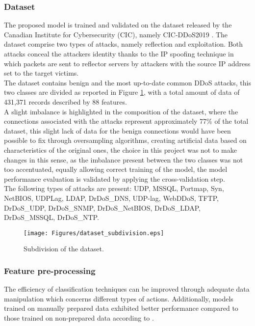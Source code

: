 \documentclass[runningheads]{llncs}
\begin{document}
\subsubsection{Dataset}
The proposed model is trained and validated on the dataset released by the Canadian Institute for Cybersecurity (CIC), namely
CIC-DDoS2019 \cite{dataset}. The dataset comprise two types of attacks, namely reflection and exploitation.
Both attacks conceal the attacker\textquotesingle s identity thanks to the IP spoofing technique \cite{ref_paper4} 
in which packets are sent to reflector servers by attackers with the source IP address set to the target victim\textquotesingle s.\\
The dataset contains benign and the most up-to-date common DDoS attacks, this two classes are divided as reported in
Figure \ref{fig2}, with a total amount of data of 431,371 records described by 88 features.\\
A slight imbalance is highlighted in the composition of the dataset, where the connections associated with the attacks represent approximately 77\% of the total dataset, this slight lack of data for the benign connections would have been possible to fix through oversampling algorithms, creating artificial data based on characteristics of the original ones, the choice in this project was not to make changes in this sense, as the imbalance present between the two classes was not too accentuated, equally allowing correct training of the model, the model performance evaluation is validated by applying the cross-validation step.\\
The following types of attacks are present: UDP, MSSQL, Portmap, Syn, NetBIOS, UDPLag, LDAP,
 DrDoS\_DNS, UDP-lag, WebDDoS, TFTP, DrDoS\_UDP, DrDoS\_SNMP,
 DrDoS\_NetBIOS, DrDoS\_LDAP, DrDoS\_MSSQL, DrDoS\_NTP.

\begin{figure}[h]
    \centering
    \texttt{[image: Figures/dataset\_subdivision.eps]}
    \caption{Subdivision of the dataset.}
    \label{fig2}
\end{figure}

\subsubsection{Feature pre-processing}
The efficiency of classification techniques can be improved through adequate data manipulation which concerns different types of actions. Additionally, models trained on manually
prepared data exhibited better performance compared to those trained on non-prepared data according to \cite{ref_paper5}.
\end{document}
